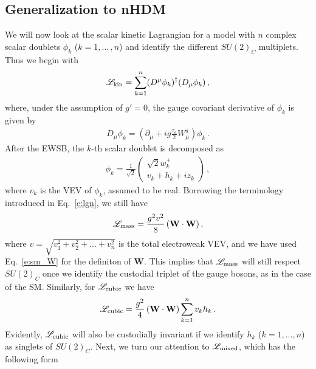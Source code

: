 \documentclass[11pt]{article}
\newcommand{\lag}[1]{\mathscr{L}_{\rm #1}}
\begin{document}
\subsection{Generalization to nHDM }
\label{s:nHDMs}
%
We will now look at the scalar kinetic Lagrangian for a model with $n$ complex scalar doublets $\phi_k$ ($k=1, \dots\,, n$) and identify the different $SU(2)_C$ multiplets.  
Thus we begin with
\begin{eqnarray}
	\label{e:lkin}
	\mathscr{L}_{\rm{kin}}= \sum_{k=1}^n(D^\mu\phi_k)^\dagger(D_\mu\phi_k)\,,
\end{eqnarray}
%
where, under the assumption of $g'=0$, the gauge covariant derivative of $\phi_k$ is given by
%
\begin{eqnarray}
	D_\mu \phi_k = \left(\partial_\mu  + ig\frac{\tau_a}{2}W_\mu^a\right) \phi_k\,.
\end{eqnarray}
%
After the EWSB, the $k$-th scalar doublet is decomposed as
%
\begin{eqnarray}
	\label{e:hd}
	\phi_k=\frac{1}{\sqrt{2}}\begin{pmatrix}
		\sqrt{2} w_k^+ \\
		v_k+h_k+i z_k
	\end{pmatrix} \, ,
\end{eqnarray}
%
where $v_k$ is the VEV of $\phi_k$, assumed to be real.  
%
Borrowing the terminology introduced in Eq.~\eqref{e:lgn}, we still have 
%
\begin{eqnarray}
	\label{e:lmass1}
	\mathscr{L}_{\rm{mass}}=\frac{g^2 v^2}{8}\left(\textbf{W}\cdot\textbf{W}\right),
\end{eqnarray}
%
where $v= \sqrt{v_1^2+v_2^2+...+v_n^2}$ is the total electroweak VEV, and we have used Eq.~\eqref{e:sm_W} for the definiton of $\mathbf{W}$.  
This implies that $\mathscr{L}_{\rm mass}$ will still respect $SU(2)_C$ once we identify the custodial triplet of the gauge bosons, as in the case of the SM.  
%
Similarly, for $\lag{cubic}$ we have
%
\begin{eqnarray}
	\label{e:nlcubic}
	\mathscr{L}_{\rm{cubic}}= \frac{g^2}{4} \left( \mathbf{W} \cdot \mathbf{W} \right) \sum_{k=1}^{n} v_k h_k \, .
\end{eqnarray}
%
Evidently, $\lag{cubic}$ will also be custodially invariant if we identify $h_k$ ($k=1, ..., n$) as singlets of $SU(2)_C$.  
%
Next, we turn our attention to $\lag{mixed}$, which has the following form
\end{document}

